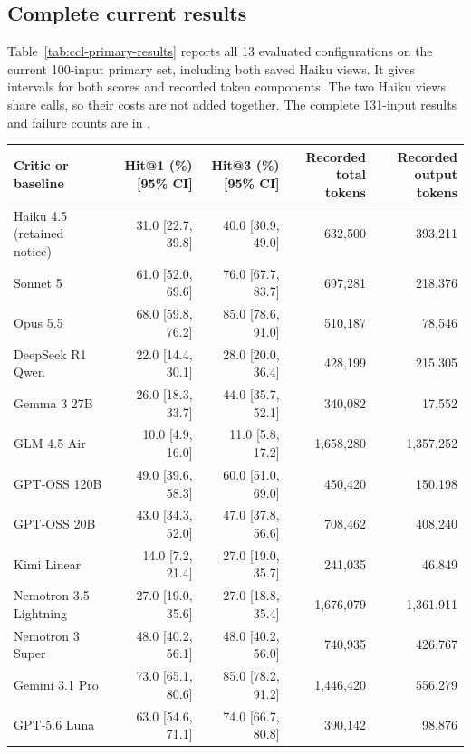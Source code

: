 \subsection{Complete current results}
\label{app:ccl-complete-table}

Table~\ref{tab:ccl-primary-results} reports all 13 evaluated configurations on the current 100-input primary set, including both saved Haiku views. It gives intervals for both scores and recorded token components. The two Haiku views share calls, so their costs are not added together. The complete 131-input results and failure counts are in .

\begin{table}[ht]
\centering\small
\setlength{\tabcolsep}{3pt}
\begin{tabular}{lrrrr}
\toprule
Critic or baseline & Hit@1 (\%) [95\% CI] & Hit@3 (\%) [95\% CI] & \shortstack{Recorded total\\tokens} & \shortstack{Recorded output\\tokens} \\
\midrule
Haiku 4.5 (retained notice) & 31.0 [22.7, 39.8] & 40.0 [30.9, 49.0] & 632,500 & 393,211 \\
Sonnet 5 & 61.0 [52.0, 69.6] & 76.0 [67.7, 83.7] & 697,281 & 218,376 \\
Opus 5.5 & 68.0 [59.8, 76.2] & 85.0 [78.6, 91.0] & 510,187 & 78,546 \\
DeepSeek R1 Qwen & 22.0 [14.4, 30.1] & 28.0 [20.0, 36.4] & 428,199 & 215,305 \\
Gemma 3 27B & 26.0 [18.3, 33.7] & 44.0 [35.7, 52.1] & 340,082 & 17,552 \\
GLM 4.5 Air & 10.0 [4.9, 16.0] & 11.0 [5.8, 17.2] & 1,658,280 & 1,357,252 \\
GPT-OSS 120B & 49.0 [39.6, 58.3] & 60.0 [51.0, 69.0] & 450,420 & 150,198 \\
GPT-OSS 20B & 43.0 [34.3, 52.0] & 47.0 [37.8, 56.6] & 708,462 & 408,240 \\
Kimi Linear & 14.0 [7.2, 21.4] & 27.0 [19.0, 35.7] & 241,035 & 46,849 \\
Nemotron 3.5 Lightning & 27.0 [19.0, 35.6] & 27.0 [18.8, 35.4] & 1,676,079 & 1,361,911 \\
Nemotron 3 Super & 48.0 [40.2, 56.1] & 48.0 [40.2, 56.0] & 740,935 & 426,767 \\
Gemini 3.1 Pro & 73.0 [65.1, 80.6] & 85.0 [78.2, 91.2] & 1,446,420 & 556,279 \\
GPT-5.6 Luna & 63.0 [54.6, 71.1] & 74.0 [66.7, 80.8] & 390,142 & 98,876 \\

\end{tabular}
\end{table}
